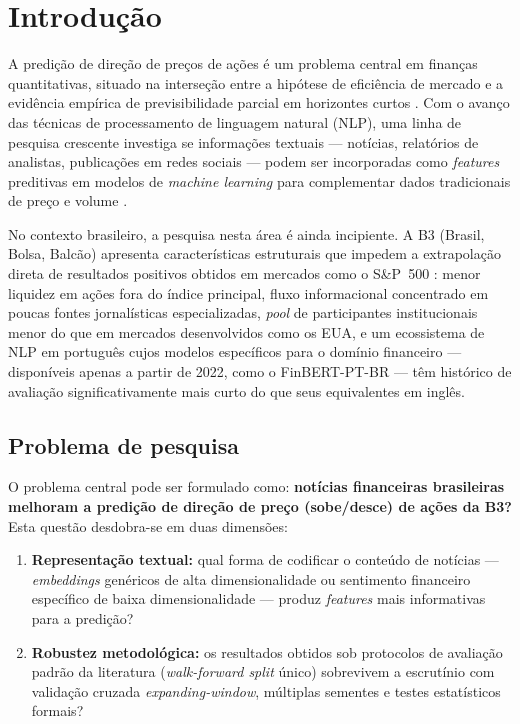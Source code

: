 \chapter{Introdução}\label{cap:introducao}

A predição de direção de preços de ações é um problema central em finanças quantitativas, situado na interseção entre a hipótese de eficiência de mercado \cite{fama1970} e a evidência empírica de previsibilidade parcial em horizontes curtos \cite{lo2004}. Com o avanço das técnicas de processamento de linguagem natural (NLP), uma linha de pesquisa crescente investiga se informações textuais --- notícias, relatórios de analistas, publicações em redes sociais --- podem ser incorporadas como \textit{features} preditivas em modelos de \textit{machine learning} para complementar dados tradicionais de preço e volume \cite{xu2018,araci2019}.

No contexto brasileiro, a pesquisa nesta área é ainda incipiente. A B3 (Brasil, Bolsa, Balcão) apresenta características estruturais que impedem a extrapolação direta de resultados positivos obtidos em mercados como o S\&P~500 \cite{xu2018,fischer2018}: menor liquidez em ações fora do índice principal, fluxo informacional concentrado em poucas fontes jornalísticas especializadas, \textit{pool} de participantes institucionais menor do que em mercados desenvolvidos como os EUA, e um ecossistema de NLP em português cujos modelos específicos para o domínio financeiro --- disponíveis apenas a partir de 2022, como o FinBERT-PT-BR \cite{souza2023} --- têm histórico de avaliação significativamente mais curto do que seus equivalentes em inglês.

\section{Problema de pesquisa}

O problema central pode ser formulado como: \textbf{notícias financeiras brasileiras melhoram a predição de direção de preço (sobe/desce) de ações da B3?} Esta questão desdobra-se em duas dimensões:

\begin{enumerate}[label=(\alph*)]
    \item \textbf{Representação textual:} qual forma de codificar o conteúdo de notícias --- \textit{embeddings} genéricos de alta dimensionalidade ou sentimento financeiro específico de baixa dimensionalidade --- produz \textit{features} mais informativas para a predição?
    \item \textbf{Robustez metodológica:} os resultados obtidos sob protocolos de avaliação padrão da literatura (\textit{walk-forward split} único) sobrevivem a escrutínio com validação cruzada \textit{expanding-window}, múltiplas sementes e testes estatísticos formais?
\end{enumerate}

